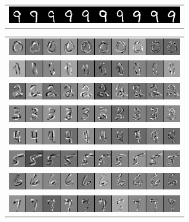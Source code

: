 \begin{figure}
\begin{subfigure}{0.45\textwidth}
\begin{tabular}{c}
  \includegraphics[width=0.90\linewidth]{predoc/images/9_ppv.png}
\end{tabular}
\end{subfigure}
\begin{subfigure}{0.45\textwidth}
\begin{tabular}{c}
  \includegraphics[width=0.9\linewidth]{predoc/images/0_eigenvectors.png}\\
  \includegraphics[width=0.90\linewidth]{predoc/images/1_eigenvectors.png}\\
  \includegraphics[width=0.90\linewidth]{predoc/images/2_eigenvectors.png}\\
  \includegraphics[width=0.90\linewidth]{predoc/images/3_eigenvectors.png}\\
  \includegraphics[width=0.90\linewidth]{predoc/images/4_eigenvectors.png}\\
  \includegraphics[width=0.90\linewidth]{predoc/images/5_eigenvectors.png}\\
  \includegraphics[width=0.90\linewidth]{predoc/images/6_eigenvectors.png}\\
  \includegraphics[width=0.90\linewidth]{predoc/images/7_eigenvectors.png}\\

\end{tabular}
\end{subfigure}
\end{figure}

